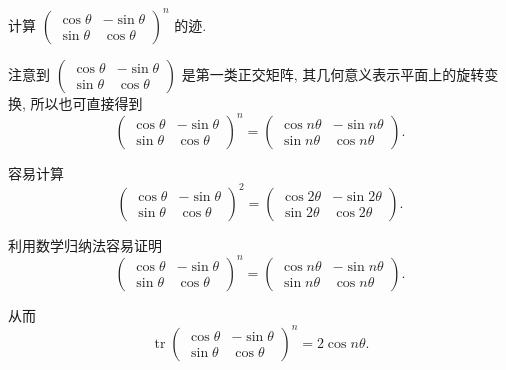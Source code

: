 \documentclass[../../main.tex]{subfiles}%
\begin{document}
\begin{example}
计算 $\begin{pmatrix} \cos\theta & -\sin\theta \\ \sin\theta & \cos\theta \end{pmatrix}^n$ 的迹.
\end{example}
\begin{remark}
注意到 $\begin{pmatrix} \cos\theta & -\sin\theta \\ \sin\theta & \cos\theta \end{pmatrix}$ 是第一类正交矩阵, 其几何意义表示平面上的旋转变换, 所以也可直接得到
$$
\begin{pmatrix} \cos\theta & -\sin\theta \\ \sin\theta & \cos\theta \end{pmatrix}^n = \begin{pmatrix} \cos n\theta & -\sin n\theta \\ \sin n\theta & \cos n\theta \end{pmatrix}.
$$
\end{remark}
\begin{solution}

容易计算
$$
\begin{pmatrix} \cos\theta & -\sin\theta \\ \sin\theta & \cos\theta \end{pmatrix}^2 = \begin{pmatrix} \cos2\theta & -\sin2\theta \\ \sin2\theta & \cos2\theta \end{pmatrix}.
$$

利用数学归纳法容易证明
$$
\begin{pmatrix} \cos\theta & -\sin\theta \\ \sin\theta & \cos\theta \end{pmatrix}^n = \begin{pmatrix} \cos n\theta & -\sin n\theta \\ \sin n\theta & \cos n\theta \end{pmatrix}.
$$

从而
$$
\operatorname{tr}\begin{pmatrix} \cos\theta & -\sin\theta \\ \sin\theta & \cos\theta \end{pmatrix}^n = 2\cos n\theta.
$$

\end{solution}
\end{document}
